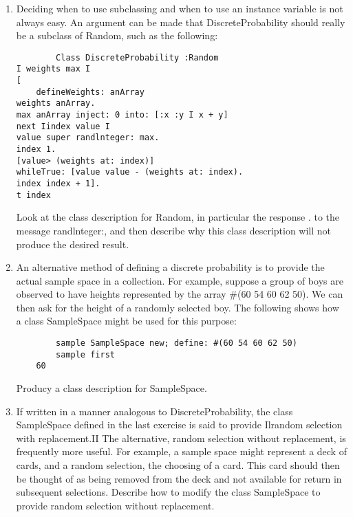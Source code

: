 \begin{enumerate}
    
    \item Deciding when to use subclassing and when to use an instance variable
    is not always easy. An argument can be made that DiscreteProbability should
    really be a subclass of Random, such as the following:
    \begin{lstlisting}
        Class DiscreteProbability :Random
I weights max I
[
    defineWeights: anArray
weights anArray.
max anArray inject: 0 into: [:x :y I x + y]
next Iindex value I
value super randlnteger: max.
index 1.
[value> (weights at: index)]
whileTrue: [value value - (weights at: index).
index index + 1].
t index
    \end{lstlisting}
    Look at the class description for Random, in particular the response . to
    the message randlnteger:, and then describe why this class description will
    not produce the desired result.

    \item An alternative method of defining a discrete probability is to provide
    the actual sample space in a collection. For example, suppose a group of
    boys are observed to have heights represented by the array \#(60 54 60 62
    50). We can then ask for the height of a randomly selected boy. The
    following shows how a class SampleSpace might be used for this purpose:
    \begin{lstlisting}
        sample SampleSpace new; define: #(60 54 60 62 50)
        sample first
    60
    \end{lstlisting}
    Producy a class description for SampleSpace.

    \item If written in a manner analogous to DiscreteProbability, the class
    SampleSpace defined in the last exercise is said to provide Ilrandom
    selection with replacement.II The alternative, random selection without
    replacement, is frequently more useful. For example, a sample space might
    represent a deck of cards, and a random selection, the choosing of a card.
    This card should then be thought of as being removed from the deck and not
    available for return in subsequent selections. Describe how to modify the
    class SampleSpace to provide random selection without replacement.
    
\end{enumerate}

\secup
